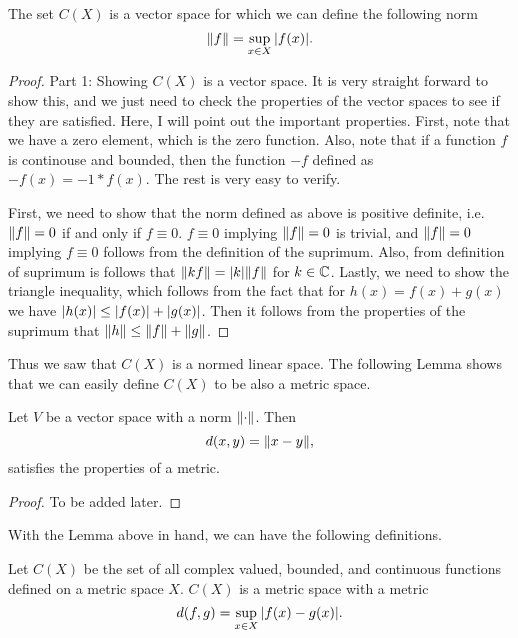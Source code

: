 \begin{proposition}
	The set $ C(X) $ is a vector space for which we can define the following norm
	\[ \norm{f} = \sup_{x\in X}|f(x)|. \]
\end{proposition}
\begin{proof}
	{\color{orange} Part 1: Showing $ C(X) $ is a vector space.  }
	It is very straight forward to show this, and we just need to check the properties of the vector spaces to see if they are satisfied. Here, I will point out the important properties. First, note that we have a zero element, which is the zero function. Also, note that if a function $ f $ is continouse and bounded, then the function $ -f $ defined as $ -f(x) =  -1 * f(x) $. The rest is very easy to verify.
	
	First, we need to show that the norm defined as above is positive definite, i.e. $ \norm{f}=0 $ if and only if $ f\equiv 0 $. $ f\equiv0 $ implying $ \norm{f} = 0 $ is trivial, and $ \norm{f} = 0 $ implying $ f\equiv0 $ follows from the definition of the suprimum. Also, from definition of suprimum is follows that $ \norm{kf} = |k|\norm{f} $ for $ k \in \mathbb{C} $. Lastly, we need to show the triangle inequality, which follows from the fact that for $ h(x) = f(x) + g(x) $ we have $ |h(x)|  \leq |f(x)| + |g(x)|$. Then it follows from the properties of the suprimum that $ \norm{h} \leq \norm{f} + \norm{g} $.
\end{proof}

Thus we saw that $ C(X) $ is a normed linear space. The following Lemma shows that we can easily define $ C(X) $ to be also a metric space. 

\begin{lemma}
	Let $ V $ be a vector space with a norm $ \norm{\cdot} $. Then
	\[ d(x,y) = \norm{x-y}, \]
	satisfies the properties of a metric.
\end{lemma}
\begin{proof}
	To be added later.
\end{proof}

With the Lemma above in hand, we can have the following definitions. 

\begin{definition}
	Let $ C(X) $ be the set of all complex valued, bounded, and continuous functions defined on a metric space $ X $. $ C(X) $ is a metric space with a metric
	\[ d(f,g) = \sup_{x \in X}|f(x)-g(x)|. \]
\end{definition}

